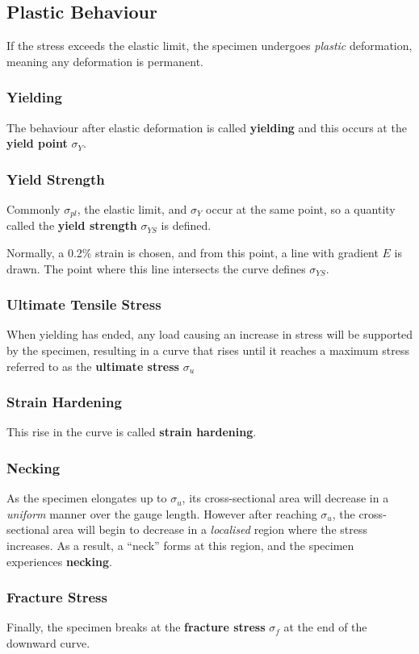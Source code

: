 \documentclass{article}
\begin{document}
\subsection{Plastic Behaviour}
If the stress exceeds the elastic limit, the specimen undergoes \textit{plastic} deformation, meaning 
any deformation is permanent.
\subsubsection{Yielding}
The behaviour after elastic deformation is called \textbf{yielding} 
and this occurs at the \textbf{yield point} \(\sigma_{Y}\).
\subsubsection{Yield Strength}
Commonly \(\sigma_{pl}\), the elastic limit, and \(\sigma_Y\) occur at the same point, 
so a quantity called the \textbf{yield strength} \(\sigma_{YS}\) is defined.

Normally, a 0.2\% strain is chosen, and from this point, a line with gradient \(E\) is drawn. 
The point where this line intersects the curve defines \(\sigma_{YS}\).
\subsubsection{Ultimate Tensile Stress}
When yielding has ended, any load causing an increase in stress will be supported by the specimen, 
resulting in a curve that rises until it reaches a maximum stress referred to as the \textbf{ultimate stress} \(\sigma_u\)
\subsubsection{Strain Hardening}
This rise in the curve is called \textbf{strain hardening}.
\subsubsection{Necking}
As the specimen elongates up to \(\sigma_u\), its cross-sectional area will decrease in a \textit{uniform} manner over the gauge length.
However after reaching \(\sigma_u\), the cross-sectional area will begin to decrease in a \textit{localised} region where
the stress increases. As a result, a ``neck'' forms at this region, and the specimen experiences \textbf{necking}.
\subsubsection{Fracture Stress}
Finally, the specimen breaks at the \textbf{fracture stress} \(\sigma_f\) at the end of the downward curve.
\end{document}
